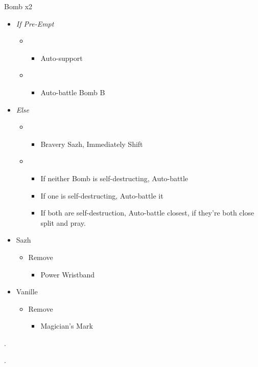 \begin{multicols}{2}
\begin{battle}{Bomb x2}
\begin{itemize}
\item \textit{If Pre-Empt}
\begin{itemize}
    \item \second
    \begin{itemize}
        \item Auto-support
    \end{itemize}
    \item \first
    \begin{itemize}
        \item Auto-battle Bomb B
    \end{itemize}
\end{itemize}
\item \textit{Else}
\begin{itemize}
    \item \second
    \begin{itemize}
        \item Bravery Sazh, Immediately Shift
    \end{itemize}
    \item \first
    \begin{itemize}
        \item If neither Bomb is self-destructing, Auto-battle
        \item If one is self-destructing, Auto-battle it
		\item If both are self-destruction, Auto-battle closest, if they're both close split and pray.
    \end{itemize}
\end{itemize}
\end{itemize}
\end{battle}

\begin{menu}
\begin{itemize}
    \equip
    \begin{itemize}
        \item Sazh
        \begin{itemize}
            \item Remove
            \begin{itemize}
                \item Power Wristband
            \end{itemize}
        \end{itemize}
        \item Vanille
        \begin{itemize}
            \item Remove
            \begin{itemize}
                \item Magician's Mark
            \end{itemize}
        \end{itemize}
    \end{itemize}
\end{itemize}
\end{menu}


.

.
\end{multicols}
